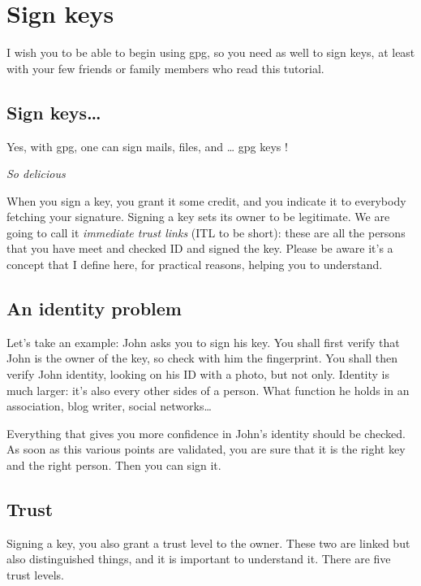 \chapter{Sign keys}

I wish you to be able to begin using gpg, so you need as well to sign keys, at least with your few friends or family members who read this
tutorial.

\section{Sign keys\ldots{}}\label{sign-keys}

Yes, with gpg, one can sign mails, files, and \ldots{} gpg keys !

\emph{So delicious}

When you sign a key, you grant it some credit, and you indicate it to everybody fetching your signature. Signing a key sets its owner to be legitimate. We are going to call it \emph{immediate trust links} (ITL to be short): these are all the persons that you have meet and checked ID and signed the key. Please be aware it's a concept that I define here, for practical reasons, helping you to understand.

\section{An identity problem}\label{an-identity-problem}

Let's take an example: John asks you to sign his key. You shall first verify that John is the owner of the key, so check with him the fingerprint. You shall then verify John identity, looking on his ID with a photo, but not only. Identity is much larger: it's also every other sides of a person. What function he holds in an association, blog writer, social networks\ldots{}

Everything that gives you more confidence in John's identity should be checked. As soon as this various points are validated, you are sure that it is the right key and the right person. Then you can sign it.

\section{Trust}\label{trust}

Signing a key, you also grant a trust level to the owner. These two are linked but also distinguished things, and it is important to understand it. There are five trust levels.

